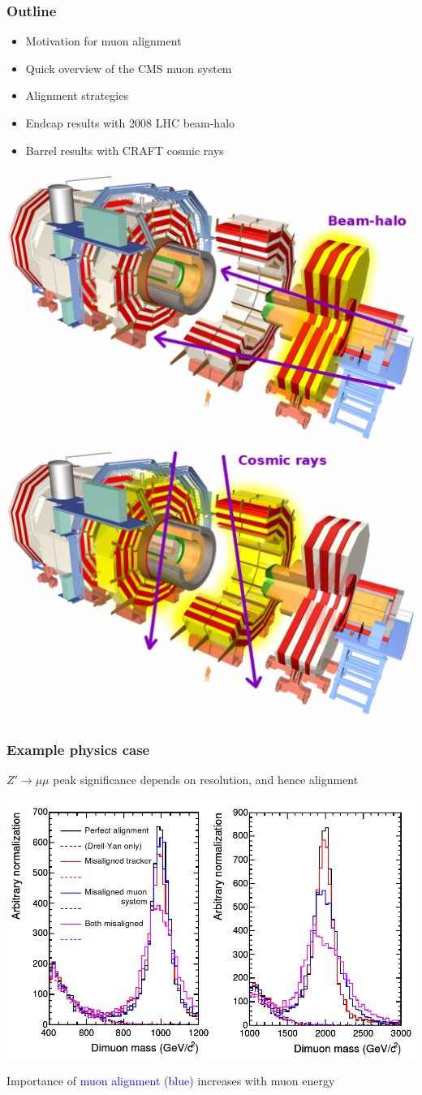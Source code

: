 \documentclass[compress]{beamer}
\begin{document}
\begin{frame}
\frametitle{Outline}
\begin{itemize}\setlength{\itemsep}{0.35 cm}
\item Motivation for muon alignment

\item Quick overview of the CMS muon system

\item Alignment strategies

\item Endcap results with 2008 LHC beam-halo

\item Barrel results with CRAFT cosmic rays
\end{itemize}

\vfill
\includegraphics[width=0.47\linewidth]{CMS_exploded_endcap.png} \hfill \includegraphics[width=0.47\linewidth]{CMS_exploded_barrel.png}
\end{frame}

\begin{frame}
\frametitle{Example physics case}

$Z' \to \mu\mu$ peak significance depends on resolution, and hence alignment

\vfill \includegraphics[width=\linewidth]{misaligned_spectra.png}

Importance of \textcolor{blue}{muon alignment (blue)} increases with muon energy
\end{frame}
\end{document}
